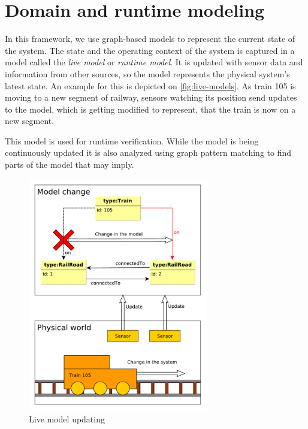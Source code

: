 \section{Domain and runtime modeling}

In this framework, we use graph-based models to represent the current state of the system. 
The state and the operating context of the system is captured in a model called the \emph{live model} or \emph{runtime model}.
It is updated with sensor data and information from other sources, so the model represents the physical system's latest state.
An example for this is depicted on \autoref{fig:live-models}. As train 105 is moving to a new segment of railway, sensors watching its position send updates to the model, which is getting modified to represent, that the train is now on a new segment.


This model is used for runtime verification.
While the model is being continuously updated it is also analyzed using graph pattern matching to find parts of the model that may imply.


\begin{figure}[H]
	\begin{center}
		\includegraphics[width=0.7\textwidth]{figures/live-models.pdf}
		\caption{Live model updating}
		\label{fig:live-models}
	\end{center}
\end{figure}

